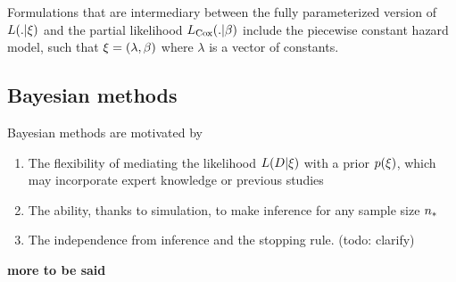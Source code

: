 Formulations that are intermediary between the fully parameterized version of $L(.|\xi)$ and the partial likelihood $L_{\mathrm{Cox}}(.|\beta)$ include the piecewise constant hazard model, such that $\xi=(\lambda,\beta)$ where $\lambda$ is a vector of constants.

\subsection{Bayesian methods}
Bayesian methods are motivated by 
\begin{enumerate}
\item The flexibility of mediating the likelihood $L(D|\xi)$ with a prior $p(\xi)$, 
which may incorporate expert knowledge or previous studies
\item The ability, thanks to simulation, to make inference for any sample size  $n_*$
\item The independence from inference and the stopping rule. (todo: clarify)
\end{enumerate}

\textbf{more to be said}

